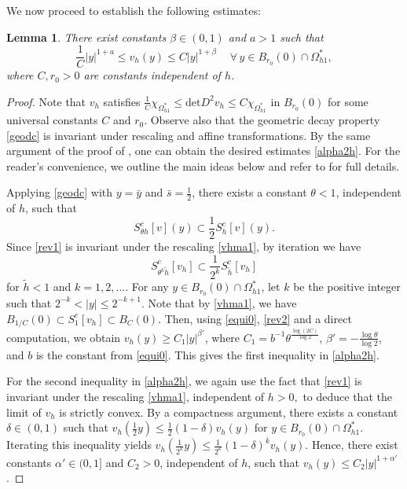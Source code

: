 \documentclass[11pt]{amsart}
\theoremstyle{plain}
\newtheorem{lemma}{Lemma}[section]
\renewcommand{\det}{\mbox{det}}
\newcommand{\0}{\textbf{0}}
\numberwithin{equation}{section}
\numberwithin{equation}{section}
\numberwithin{figure}{section}
\begin{document}
We now proceed to establish the following estimates:
\begin{lemma}\label{vesttoday}
There exist constants $\beta \in (0, 1)$ and $a > 1$ such that 
\begin{equation}\label{alpha2h}
\frac{1}{C}|y|^{1+a} \leq v_h(y) \leq C|y|^{1+\beta} \quad\ \forall\, y \in B_{r_0}(0) \cap \Omega_{h1}^*,
\end{equation}
where $C, r_0 > 0$ are constants independent of $h$.
\end{lemma}
\begin{proof}
Note that $v_h$ satisfies $\frac{1}{C}\chi_{\Omega^*_{h1}} \leq \det D^2v_h \leq C\chi_{\Omega^*_{h1}}$ in $B_{r_0}(0)$ for some universal constants $C$ and $r_0$. 
Observe also that the geometric decay property \eqref{geodc} is invariant under rescaling and affine transformations. 
By the same argument of the proof of \cite[Lemma 5.13]{CLW3}, one can obtain the desired estimates \eqref{alpha2h}.
 For the reader's convenience, we outline the main ideas below and refer to \cite{CLW3} for full details. 

Applying \eqref{geodc} with $y=\bar y$ and $\bar s=\frac12$, there exists a constant $\theta<1$, independent of $h$, such that
	\begin{equation}\label{rev1}
	 	S^c_{\theta h}[v](y) \subset \frac12 S^c_h[v](y).
	\end{equation}
Since \eqref{rev1} is invariant under the rescaling \eqref{vhma1}, by iteration we have
	\begin{equation}\label{rev2}
		S^c_{\theta^k \tilde h}[v_h] \subset \frac{1}{2^k} S^c_{\tilde h}[v_h]
	\end{equation}
for $\tilde h<1$ and $k=1,2,...$. For any $y \in B_{r_0}(0) \cap \Omega_{h1}^*$, let $k$ be the positive integer such that $2^{-k}<|y|\leq 2^{-k+1}$. 
Note that by \eqref{vhma1}, we have $B_{1/C}(0)\subset S^c_1[v_h]\subset B_C(0)$. Then, using \eqref{equi0}, \eqref{rev2} and a direct computation, we obtain $v_h(y)\geq C_1|y|^{\beta'}$, where $C_1=b^{-1}\theta^{\frac{\log(2C)}{\log 2}}$, $\beta'=-\frac{\log\theta}{\log 2}$, and $b$ is the constant from \eqref{equi0}. This gives the first inequality in \eqref{alpha2h}. 

For the second inequality in \eqref{alpha2h}, we again use the fact that \eqref{rev1} is invariant under the rescaling \eqref{vhma1}, independent of $h>0,$ to deduce that the limit of $v_h$ is strictly convex. By a compactness argument, there exists a constant $\delta\in(0,1)$ such that $v_h(\frac12y)\leq \frac12(1-\delta)v_h(y)$ for $y \in B_{r_0}(0) \cap \Omega_{h1}^*$. Iterating this inequality yields $v_h(\frac{1}{2^k}y) \leq \frac{1}{2^k}(1-\delta)^kv_h(y)$.  Hence, there exist constants $\alpha'\in(0,1]$ and $C_2>0$, independent of $h$, such that $v_h(y)\leq C_2|y|^{1+\alpha'}$. 

\end{proof}
\end{document}

